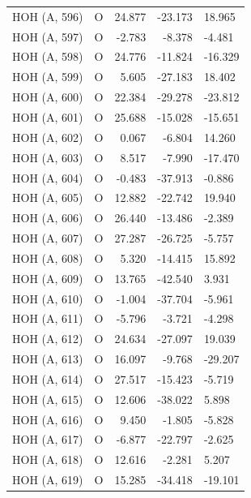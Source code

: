 \begin{longtable}{@{}lcrr@{}}
  \cmidrule(r){1-5}
  HOH (A, 596) & O & 24.877 & -23.173 & 18.965 \\
  \cmidrule(r){1-5}
  HOH (A, 597) & O & -2.783 & -8.378 & -4.481 \\
  \cmidrule(r){1-5}
  HOH (A, 598) & O & 24.776 & -11.824 & -16.329 \\
  \cmidrule(r){1-5}
  HOH (A, 599) & O & 5.605 & -27.183 & 18.402 \\
  \cmidrule(r){1-5}
  HOH (A, 600) & O & 22.384 & -29.278 & -23.812 \\
  \cmidrule(r){1-5}
  HOH (A, 601) & O & 25.688 & -15.028 & -15.651 \\
  \cmidrule(r){1-5}
  HOH (A, 602) & O & 0.067 & -6.804 & 14.260 \\
  \cmidrule(r){1-5}
  HOH (A, 603) & O & 8.517 & -7.990 & -17.470 \\
  \cmidrule(r){1-5}
  HOH (A, 604) & O & -0.483 & -37.913 & -0.886 \\
  \cmidrule(r){1-5}
  HOH (A, 605) & O & 12.882 & -22.742 & 19.940 \\
  \cmidrule(r){1-5}
  HOH (A, 606) & O & 26.440 & -13.486 & -2.389 \\
  \cmidrule(r){1-5}
  HOH (A, 607) & O & 27.287 & -26.725 & -5.757 \\
  \cmidrule(r){1-5}
  HOH (A, 608) & O & 5.320 & -14.415 & 15.892 \\
  \cmidrule(r){1-5}
  HOH (A, 609) & O & 13.765 & -42.540 & 3.931 \\
  \cmidrule(r){1-5}
  HOH (A, 610) & O & -1.004 & -37.704 & -5.961 \\
  \cmidrule(r){1-5}
  HOH (A, 611) & O & -5.796 & -3.721 & -4.298 \\
  \cmidrule(r){1-5}
  HOH (A, 612) & O & 24.634 & -27.097 & 19.039 \\
  \cmidrule(r){1-5}
  HOH (A, 613) & O & 16.097 & -9.768 & -29.207 \\
  \cmidrule(r){1-5}
  HOH (A, 614) & O & 27.517 & -15.423 & -5.719 \\
  \cmidrule(r){1-5}
  HOH (A, 615) & O & 12.606 & -38.022 & 5.898 \\
  \cmidrule(r){1-5}
  HOH (A, 616) & O & 9.450 & -1.805 & -5.828 \\
  \cmidrule(r){1-5}
  HOH (A, 617) & O & -6.877 & -22.797 & -2.625 \\
  \cmidrule(r){1-5}
  HOH (A, 618) & O & 12.616 & -2.281 & 5.207 \\
  \cmidrule(r){1-5}
  HOH (A, 619) & O & 15.285 & -34.418 & -19.101 \\

\end{longtable}
